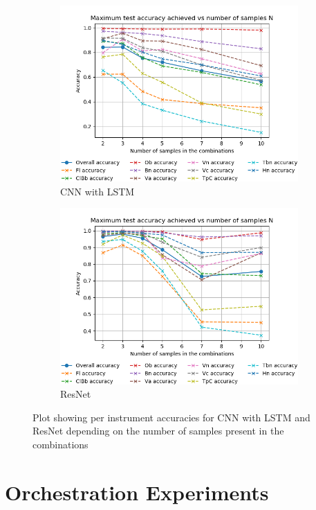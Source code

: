 \documentclass[runningheads,a4paper]{llncs}
\begin{document}
\begin{figure}[h]
  \centering
  \begin{subfigure}{.52\textwidth}
    \centering
    \includegraphics[width=0.9\linewidth]{../ISMIR_2020/figs/Acc_vs_N_CNN.png}
    \caption{CNN with LSTM}
    \label{best_acc_cnn}
  \end{subfigure}%
  \begin{subfigure}{.52\textwidth}
    \centering
    \includegraphics[width=0.9\linewidth]{../ISMIR_2020/figs/Acc_vs_N_ResNet.png}
    \caption{ResNet}
    \label{best_acc_resnet}
  \end{subfigure}
  \caption{Plot showing per instrument accuracies for CNN with LSTM and ResNet depending on the number of samples present in the combinations}
  \label{best_acc}
  \end{figure}

\section{Orchestration Experiments}
\label{sec:orchestration}
\end{document}
